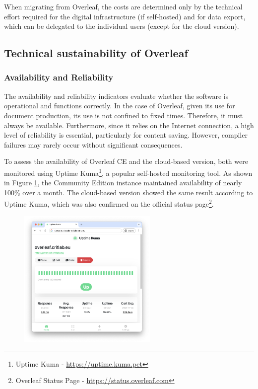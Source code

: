 When migrating from Overleaf, the costs are determined only by the technical effort required for the digital infrastructure (if self-hosted) and for data export, which can be delegated to the individual users (except for the cloud version).

\bigskip

\subsection{Technical sustainability of Overleaf}
\label{subsec:overleaf-technical}
\medskip

\subsubsection{Availability and Reliability}
The availability and reliability indicators evaluate whether the software is operational and functions correctly. In the case of Overleaf, given its use for document production, its use is not confined to fixed times. Therefore, it must always be available. Furthermore, since it relies on the Internet connection, a high level of reliability is essential, particularly for content saving. However, compiler failures may rarely occur without significant consequences.

To assess the availability of Overleaf CE and the cloud-based version, both were monitored using Uptime Kuma\footnote{Uptime Kuma - \href{https://uptime.kuma.pet/}{https://uptime.kuma.pet}}, a popular self-hosted monitoring tool.
As shown in Figure \ref{fig:overleaf_availability}, the Community Edition instance maintained availability of nearly 100\% over a month. The cloud-based version showed the same result according to Uptime Kuma, which was also confirmed on the official status page\footnote{Overleaf Status Page - \href{https://status.overleaf.com/}{https://status.overleaf.com}}. 

\begin{figure}[ht!]
  \centering
  \includegraphics[width=0.6\textwidth]{img/overleaf_availability.png}
  \caption{}
  \label{fig:overleaf_availability}
\end{figure}

